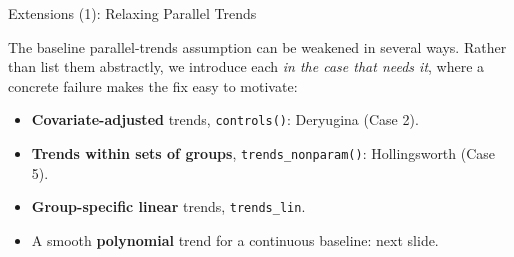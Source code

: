 \documentclass[main.tex]{subfiles}
\begin{document}
\begin{frame}{Extensions (1): Relaxing Parallel Trends}

  The baseline parallel-trends assumption can be weakened in several ways.
  Rather than list them abstractly, we introduce each \emph{in the case that
  needs it}, where a concrete failure makes the fix easy to motivate:

  \medskip
  \begin{itemize}
    \item \textbf{Covariate-adjusted} trends, \texttt{controls()}: Deryugina (Case 2).
    \item \textbf{Trends within sets of groups}, \texttt{trends\_nonparam()}: Hollingsworth (Case 5).
    \item \textbf{Group-specific linear} trends, \texttt{trends\_lin}.
    \item A smooth \textbf{polynomial} trend for a continuous baseline: next slide.
  \end{itemize}

\end{frame}
\end{document}
